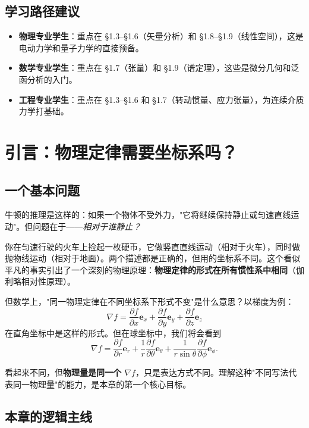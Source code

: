 \subsection{学习路径建议}

\begin{itemize}
  \item \textbf{物理专业学生}：重点在 \S1.3--\S1.6（矢量分析）和 \S1.8--\S1.9（线性空间），这是电动力学和量子力学的直接预备。
  \item \textbf{数学专业学生}：重点在 \S1.7（张量）和 \S1.9（谱定理），这些是微分几何和泛函分析的入门。
  \item \textbf{工程专业学生}：重点在 \S1.3--\S1.6 和 \S1.7（转动惯量、应力张量），为连续介质力学打基础。
\end{itemize}

\section{引言：物理定律需要坐标系吗？}

\subsection{一个基本问题}

牛顿的推理是这样的：如果一个物体不受外力，"它将继续保持静止或匀速直线运动"。但问题在于——\textit{相对于谁静止？}

你在匀速行驶的火车上捡起一枚硬币，它做竖直直线运动（相对于火车），同时做抛物线运动（相对于地面）。两个描述都是正确的，但用的坐标系不同。这个看似平凡的事实引出了一个深刻的物理原理：\textbf{物理定律的形式在所有惯性系中相同}（伽利略相对性原理）。

但数学上，"同一物理定律在不同坐标系下形式不变"是什么意思？以梯度为例：
\[
\nabla f = \frac{\partial f}{\partial x}\mathbf{e}_x + \frac{\partial f}{\partial y}\mathbf{e}_y + \frac{\partial f}{\partial z}\mathbf{e}_z
\]
在直角坐标中是这样的形式。但在球坐标中，我们将会看到
\[
\nabla f = \frac{\partial f}{\partial r}\mathbf{e}_r + \frac{1}{r}\frac{\partial f}{\partial\theta}\mathbf{e}_\theta + \frac{1}{r\sin\theta}\frac{\partial f}{\partial\phi}\mathbf{e}_\phi .
\]

看起来不同，但\textbf{物理量是同一个 $\nabla f$}，只是表达方式不同。理解这种"不同写法代表同一物理量"的能力，是本章的第一个核心目标。

\subsection{本章的逻辑主线}

